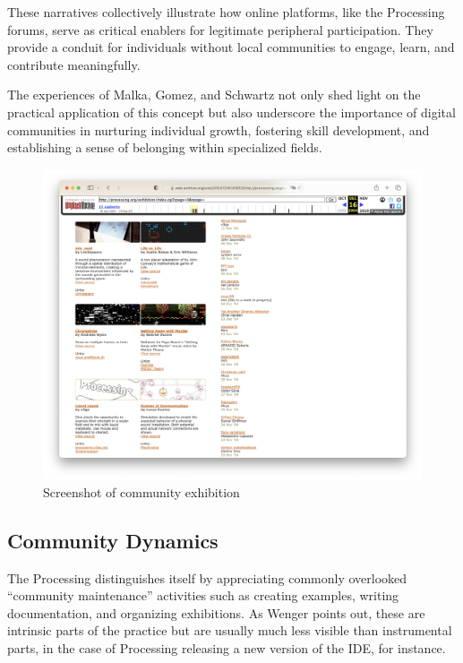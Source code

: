These narratives collectively illustrate how online platforms, like the Processing forums, serve as critical enablers for legitimate peripheral participation. They provide a conduit for individuals without local communities to engage, learn, and contribute meaningfully. 

The experiences of Malka, Gomez, and Schwartz not only shed light on the practical application of this concept but also underscore the importance of digital communities in nurturing individual growth, fostering skill development, and establishing a sense of belonging within specialized fields.


\newpage
\begin{figure}
	\centering
	\includegraphics[width=1.0\textwidth]{images/exhibitions.png}
	\caption{Screenshot of community exhibition}
	\label{fig:website-exhibition}
\end{figure}

\subsection{Community Dynamics}
The Processing distinguishes itself by appreciating commonly overlooked \enquote{community maintenance} activities such as creating examples, writing documentation, and organizing exhibitions. As Wenger points out, these are intrinsic parts of the practice but are usually much less visible than instrumental parts, in the case of Processing releasing a new version of the IDE, for instance. \parencite[78]{wengerCommunitiesPracticeLearning1998}

